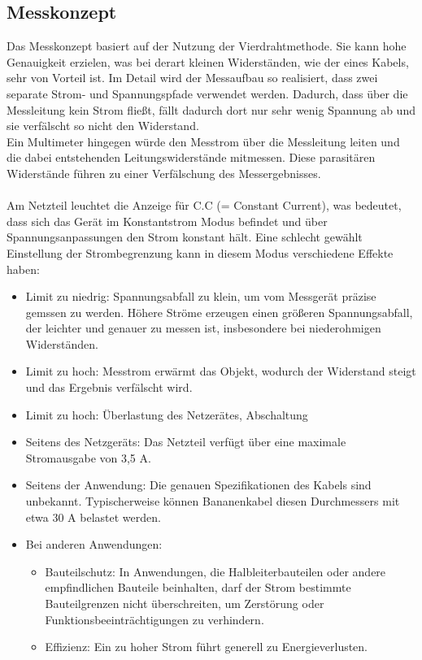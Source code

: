\documentclass[a4paper,12pt]{article}
\begin{document}
\subsection{Messkonzept}
Das Messkonzept basiert auf der Nutzung der Vierdrahtmethode. Sie kann hohe Genauigkeit erzielen, was bei derart kleinen Widerständen, wie der eines Kabels, sehr von Vorteil ist. Im Detail wird der Messaufbau so realisiert, dass zwei separate Strom- und Spannungspfade verwendet werden. Dadurch, dass über die Messleitung kein Strom fließt, fällt dadurch dort nur sehr wenig Spannung ab und sie verfälscht so nicht den Widerstand.\\
\noindent Ein Multimeter hingegen würde den Messtrom über die Messleitung leiten und die dabei entstehenden Leitungswiderstände mitmessen. Diese parasitären Widerstände führen zu einer Verfälschung des Messergebnisses. \\\\
\noindent Am Netzteil leuchtet die Anzeige für C.C (= Constant Current), was bedeutet, dass sich das Gerät im Konstantstrom Modus befindet und über Spannungsanpassungen den Strom konstant hält. Eine schlecht gewählt Einstellung der Strombegrenzung kann in diesem Modus verschiedene Effekte haben:
\begin{itemize}
\item Limit zu niedrig: Spannungsabfall zu klein, um vom Messgerät präzise gemssen zu werden. Höhere Ströme erzeugen einen größeren Spannungsabfall, der leichter und genauer zu messen ist, insbesondere bei niederohmigen Widerständen.
\item Limit zu hoch: Messtrom erwärmt das Objekt, wodurch der Widerstand steigt und das Ergebnis verfälscht wird.
\item Limit zu hoch: Überlastung des Netzerätes, Abschaltung\\
\end{itemize}
\newpage
{}
\begin{itemize}
\item Seitens des Netzgeräts: Das Netzteil verfügt über eine maximale Stromausgabe von 3,5 A.
\item Seitens der Anwendung: Die genauen Spezifikationen des Kabels sind unbekannt. Typischerweise können Bananenkabel diesen Durchmessers mit etwa 30 A belastet werden. 
\item Bei anderen Anwendungen: 
	\begin{itemize}
	\item Bauteilschutz: In Anwendungen, die Halbleiterbauteilen oder andere empfindlichen Bauteile beinhalten, darf der Strom bestimmte Bauteilgrenzen nicht überschreiten, um Zerstörung oder Funktionsbeeinträchtigungen zu verhindern.
	\item Effizienz: Ein zu hoher Strom führt generell zu Energieverlusten.\\
	\end{itemize}
\end{itemize}
\end{document}
